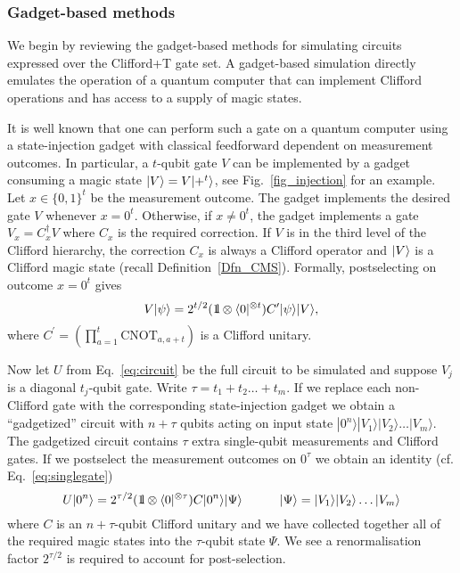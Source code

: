 \subsubsection{Gadget-based methods}
\label{sec:gadgetbased}
We begin by reviewing the gadget-based methods for simulating circuits expressed over the Clifford+T gate set. A gadget-based simulation directly emulates the operation of a quantum computer that can implement Clifford operations and has access to a supply of magic states.

It is well known that one can perform such a gate on a quantum computer using a state-injection gadget with classical feedforward dependent on measurement outcomes.  In particular, a $t$-qubit gate $V$ can be implemented by a gadget consuming a magic state $\vert V\rangle=V \vert+^ t\rangle$, see  Fig.~\ref{fig_injection} for an example. Let $x\in \{0,1\}^t$ be the measurement outcome.  The gadget implements the desired gate $V$ whenever $x=0^t$.  Otherwise, if  ${x} \neq {0^t}$, the gadget implements a gate $V_x=C^\dagger_x V$ where $C_x$ is the required correction.  If $V$ is in the third level of the Clifford hierarchy, the correction $C_x$ is always a Clifford operator and $\vert V\rangle$ is a Clifford magic state (recall Definition~\ref{Dfn_CMS}).  Formally, postselecting on outcome $x=0^t$ gives
\begin{equation}
V|\psi\rangle= 2^{t/2} (\id \otimes \bra{0}^{\otimes t}) C^{\prime} |\psi\rangle  \ket{V},
\label{eq:singlegate}
\end{equation}
where $C^{\prime}=\left(\prod_{a=1}^{t} \mathrm{CNOT}_{a,a+t}\right)$ is a Clifford unitary.


Now let $U$ from Eq.~\eqref{eq:circuit} be the full circuit to be simulated and suppose $V_j$ is a diagonal $t_j$-qubit gate. Write $\tau=t_1+t_2\ldots+t_m$. If we replace each non-Clifford gate with the corresponding state-injection gadget we obtain a ``gadgetized'' circuit with $n+\tau$ qubits acting on input state $|0^n\rangle|V_1\rangle|V_2\rangle\ldots |V_m\rangle$.  The gadgetized circuit contains $\tau$ extra single-qubit measurements and Clifford gates. If we postselect the measurement outcomes on $0^{\tau}$ we obtain an identity (cf. Eq.~\eqref{eq:singlegate})
\begin{equation}
U|0^n\rangle=2^{\tau/2} (\id \otimes \bra{0}^{\otimes \tau}) C|0^n\rangle|\Psi\rangle\qquad \quad |\Psi\rangle=|V_1\rangle|V_2\rangle\ldots |V_m\rangle
\label{eq:Uidentity}
\end{equation}
where $C$ is an $n+\tau$-qubit Clifford unitary and we have collected together all of the required magic states into the $\tau$-qubit state $\Psi$. We see a renormalisation factor $2^{\tau/2}$ is required to account for post-selection. 

